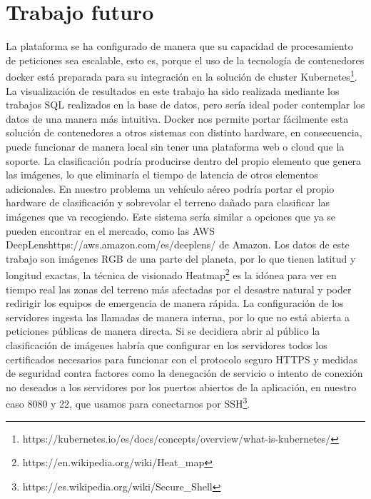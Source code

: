 \section{Trabajo futuro}\label{sec:trabajo-futuro}
La plataforma se ha configurado de manera que su capacidad de procesamiento de peticiones sea escalable, esto es, porque el uso de la tecnología de contenedores docker
está preparada para su integración en la solución de cluster Kubernetes\footnote{https://kubernetes.io/es/docs/concepts/overview/what-is-kubernetes/}.
La visualización de resultados en este trabajo ha sido realizada mediante los trabajos SQL realizados en la base de datos, pero sería ideal poder contemplar los datos de una manera más intuitiva.
Docker nos permite portar fácilmente esta solución de contenedores a otros sistemas con distinto hardware, en consecuencia, puede funcionar de manera local sin tener una plataforma web o cloud que la soporte.
La clasificación podría producirse dentro del propio elemento que genera las imágenes, lo que eliminaría el tiempo de latencia de otros elementos adicionales.
En nuestro problema un vehículo aéreo podría portar el propio hardware de clasificación y sobrevolar el terreno dañado para clasificar las imágenes que va recogiendo.
Este sistema sería similar a opciones que ya se pueden encontrar en el mercado, como las AWS DeepLens{https://aws.amazon.com/es/deeplens/} de Amazon.
Los datos de este trabajo son imágenes RGB de una parte del planeta, por lo que tienen latitud y longitud exactas, la técnica de visionado Heatmap\footnote{https://en.wikipedia.org/wiki/Heat_map} es la idónea para ver en tiempo real las zonas del terreno más afectadas por el desastre natural y poder redirigir los equipos de emergencia de manera rápida.
La configuración de los servidores ingesta las llamadas de manera interna, por lo que no está abierta a peticiones públicas de manera directa.
Si se decidiera abrir al público la clasificación de imágenes habría que configurar en los servidores todos los certificados necesarios para funcionar con el protocolo seguro HTTPS y medidas de seguridad contra factores como la denegación de servicio o intento de conexión no deseados a los servidores por los puertos abiertos de la aplicación, en nuestro caso 8080 y 22, que usamos para conectarnos por SSH\footnote{https://es.wikipedia.org/wiki/Secure_Shell}.

